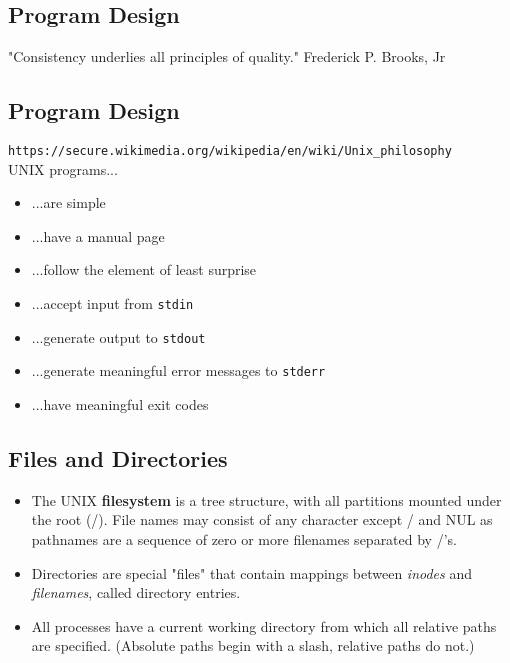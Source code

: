 \documentclass[xga]{xdvislides}
\begin{document}
\subsection{Program Design}
\vspace*{\fill}
\Huge
\begin{center}
"Consistency underlies all principles of quality." Frederick P. Brooks, Jr
\end{center}
\Normalsize
\vspace*{\fill}


\subsection{Program Design}
\verb+https://secure.wikimedia.org/wikipedia/en/wiki/Unix_philosophy+ \\

UNIX programs...
\begin{itemize}
	\item ...are simple
	\item ...have a manual page
	\item ...follow the element of least surprise
	\item ...accept input from {\tt stdin}
	\item ...generate output to {\tt stdout}
	\item ...generate meaningful error messages to {\tt stderr}
	\item ...have meaningful exit codes
\end{itemize}


\subsection{Files and Directories}
\begin{itemize}
	\item The UNIX {\bf filesystem} is a tree structure, with all partitions
		mounted under the root (/). File names may consist of any
		character except / and NUL as pathnames are a sequence of
		zero or more filenames separated by /'s.
	\item Directories are special "files" that contain mappings
		between {\em inodes} and {\em filenames}, called directory
		entries.
	\item All processes have a current working directory from which
		all relative paths are specified. (Absolute paths begin
		with a slash, relative paths do not.)
\end{itemize}
\end{document}
